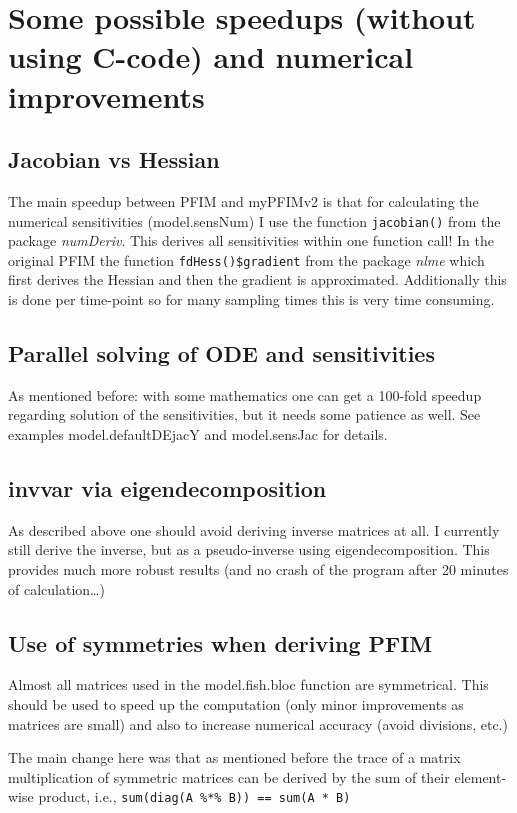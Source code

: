 \section{Some possible speedups (without using C-code) and numerical improvements}
\subsection{Jacobian vs Hessian}
The main speedup between PFIM and myPFIMv2 is that for calculating the numerical sensitivities (model.sensNum) I use the function \verb!jacobian()! from the package {\it numDeriv}.
This derives all sensitivities within one function call!
In the original PFIM the function \verb!fdHess()$gradient! from the package {\it nlme} which first derives the Hessian and then the gradient is approximated. 
Additionally this is done per time-point so for many sampling times this is very time consuming.


\subsection{Parallel solving of ODE and sensitivities}
As mentioned before: with some mathematics one can get a 100-fold speedup regarding solution of the sensitivities, but it needs some patience as well.
See examples model.defaultDEjacY and model.sensJac for details.

\subsection{invvar via eigendecomposition}
As described above one should avoid deriving inverse matrices at all.
I currently still derive the inverse, but as a pseudo-inverse using eigendecomposition.
This provides much more robust results (and no crash of the program after 20 minutes of calculation\dots)

\subsection{Use of symmetries when deriving PFIM}
Almost all matrices used in the model.fish.bloc function are symmetrical.
This should be used to speed up the computation (only minor improvements as matrices are small) and also to increase numerical accuracy (avoid divisions, etc.)

The main change here was that as mentioned before the trace of a matrix multiplication of symmetric matrices can be derived by the sum of their element-wise product, i.e.,
\verb!sum(diag(A %*% B)) == sum(A * B)!
